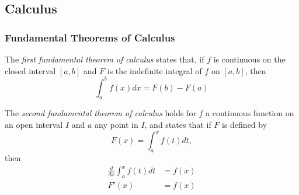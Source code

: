 \subsection{Calculus} \label{app:Calculus}
	\subsubsection{Fundamental Theorems of Calculus} \label{subsubsec:Fundamental Theorem of Calculus}
		\begin{definition} \label{def:1st Fundamental Theorem of Calculus}
			The \emph{first fundamental theorem of calculus} states that, if $f$ is continuous on the closed interval $\left[ a,b \right]$ and $F$ is the indefinite integral of $f$ on $\left[ a,b \right]$, then 
			\begin{equation} \label{eq:1st Fundamental Theorem of Calculus}
				\int_{a}^{b}f \left( x \right) dx = F \left( b \right) - F \left( a \right)
			\end{equation}
		\end{definition}
		\begin{definition} \label{def:2nd Fundamental Theorem of Calculus}
			The \emph{second fundamental theorem of calculus} holds for $f$ a continuous function on an open interval $I$ and $a$ any point in $I$, and states that if $F$ is defined by
			\begin{equation*}
				F \left( x \right) = \int_{a}^{x} f \left( t \right) dt,
			\end{equation*}
			then
			\begin{equation} \label{eq:2nd Fundamental Theorem of Calculus}
				\begin{aligned}
					\frac{d}{dx} \int_{a}^{x} f \left( t \right) dt &= f \left( x \right) \\
					F' \left( x \right) &= f \left( x \right) \\
				\end{aligned}
			\end{equation}
		\end{definition}